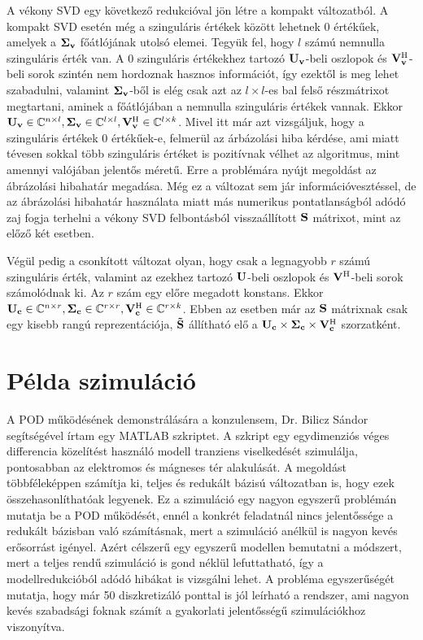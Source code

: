             A vékony SVD egy következő redukcióval jön létre a kompakt változatból. A kompakt SVD esetén még a szinguláris értékek között lehetnek 0 értékűek, amelyek a ${\bf \Sigma_v}$ főátlójának utolsó elemei. Tegyük fel, hogy $l$ számú nemnulla szinguláris érték van. A 0 szinguláris értékekhez tartozó ${\bf U_v}$-beli oszlopok és ${\bf V_v^{\mathrm{H}}}$-beli sorok szintén nem hordoznak hasznos információt, így ezektől is meg lehet szabadulni, valamint ${\bf \Sigma_v}$-ből is elég csak azt az $l\times l$-es bal felső részmátrixot megtartani, aminek a főátlójában a nemnulla szinguláris értékek vannak. Ekkor ${\bf U_v} \in \mathbb{C}^{n\times l}, {\bf \Sigma_v} \in \mathbb{C}^{l\times l}, {\bf V_v^{\mathrm{H}}} \in \mathbb{C}^{l\times k}$. Mivel itt már azt vizsgáljuk, hogy a szinguláris értékek 0 értékűek-e, felmerül az árbázolási hiba kérdése, ami miatt tévesen sokkal több szinguláris értéket is pozitívnak vélhet az algoritmus, mint amennyi valójában jelentős méretű. Erre a problémára nyújt megoldást az ábrázolási hibahatár megadása. Még ez a változat sem jár információvesztéssel, de az ábrázolási hibahatár használata miatt más numerikus pontatlanságból adódó zaj fogja terhelni a vékony SVD felbontásból visszaállított ${\bf S}$ mátrixot, mint az előző két esetben.
            \par
            Végül pedig a csonkított változat olyan, hogy csak a legnagyobb $r$ számú szinguláris érték, valamint az ezekhez tartozó ${\bf U}$-beli oszlopok és ${\bf V^{\mathrm{H}}}$-beli sorok számolódnak ki. Az $r$ szám egy előre megadott konstans. Ekkor ${\bf U_c} \in \mathbb{C}^{n\times r}, {\bf \Sigma_c} \in \mathbb{C}^{r\times r}, {\bf V_c^{\mathrm{H}}} \in \mathbb{C}^{r\times k}$. Ebben az esetben már az ${\bf S}$ mátrixnak csak egy kisebb rangú reprezentációja, ${\bf \tilde{S}}$ állítható elő a ${\bf U_c \times\Sigma_c\times V_c^{\mathrm{H}}}$ szorzatként.
    \section{Példa szimuláció}
        A POD működésének demonstrálására a konzulensem, Dr. Bilicz Sándor segítségével írtam egy MATLAB szkriptet. A szkript egy egydimenziós véges differencia közelítést használó modell tranziens viselkedését szimulálja, pontosabban az elektromos és mágneses tér alakulását. A megoldást többféleképpen számítja ki, teljes és redukált bázisú változatban is, hogy ezek összehasonlíthatóak legyenek. Ez a szimuláció egy nagyon egyszerű problémán mutatja be a POD működését, ennél a konkrét feladatnál nincs jelentőssége a redukált bázisban való számításnak, mert a szimuláció anélkül is nagyon kevés erősorrást igényel. Azért célszerű egy egyszerű modellen bemutatni a módszert, mert a teljes rendű szimuláció is gond néklül lefuttatható, így a modellredukcióból adódó hibákat is vizsgálni lehet. A probléma egyszerűségét mutatja, hogy már 50 diszkretizáló ponttal is jól leírható a rendszer, ami nagyon kevés szabadsági foknak számít a gyakorlati jelentősségű szimulációkhoz viszonyítva.
